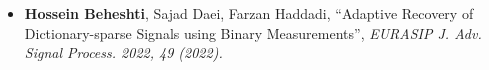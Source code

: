 
\begin{itemize}
	\item{
	            \textbf{Hossein Beheshti}, Sajad Daei, Farzan Haddadi, ``Adaptive Recovery of Dictionary-sparse Signals using Binary Measurements'',
	            \emph{EURASIP J. Adv. Signal Process. 2022, 49 (2022).}
	      }
\end{itemize}
